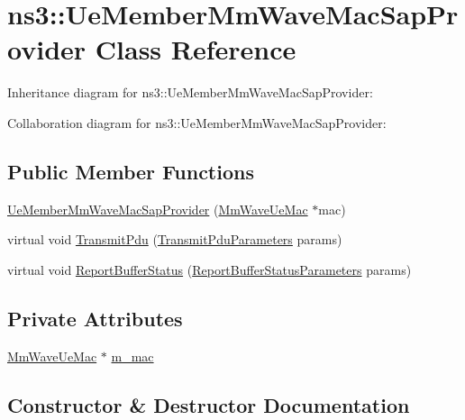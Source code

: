\hypertarget{classns3_1_1UeMemberMmWaveMacSapProvider}{}\section{ns3\+:\+:Ue\+Member\+Mm\+Wave\+Mac\+Sap\+Provider Class Reference}
\label{classns3_1_1UeMemberMmWaveMacSapProvider}


Inheritance diagram for ns3\+:\+:Ue\+Member\+Mm\+Wave\+Mac\+Sap\+Provider\+:


Collaboration diagram for ns3\+:\+:Ue\+Member\+Mm\+Wave\+Mac\+Sap\+Provider\+:
\subsection*{Public Member Functions}
\begin{DoxyCompactItemize}
\item 
\hyperlink{classns3_1_1UeMemberMmWaveMacSapProvider_a691beeeecdb74c413612b187ee0d1d78}{Ue\+Member\+Mm\+Wave\+Mac\+Sap\+Provider} (\hyperlink{classns3_1_1MmWaveUeMac}{Mm\+Wave\+Ue\+Mac} $\ast$mac)
\item 
virtual void \hyperlink{classns3_1_1UeMemberMmWaveMacSapProvider_a9ee1c7c091f5bf1919c0bc18f777402c}{Transmit\+Pdu} (\hyperlink{structns3_1_1LteMacSapProvider_1_1TransmitPduParameters}{Transmit\+Pdu\+Parameters} params)
\item 
virtual void \hyperlink{classns3_1_1UeMemberMmWaveMacSapProvider_af0462f1df981294540e1221bef158c51}{Report\+Buffer\+Status} (\hyperlink{structns3_1_1LteMacSapProvider_1_1ReportBufferStatusParameters}{Report\+Buffer\+Status\+Parameters} params)
\end{DoxyCompactItemize}
\subsection*{Private Attributes}
\begin{DoxyCompactItemize}
\item 
\hyperlink{classns3_1_1MmWaveUeMac}{Mm\+Wave\+Ue\+Mac} $\ast$ \hyperlink{classns3_1_1UeMemberMmWaveMacSapProvider_a9af89125b0671d9f93cf574d81b09d51}{m\+\_\+mac}
\end{DoxyCompactItemize}


\subsection{Constructor \& Destructor Documentation}
